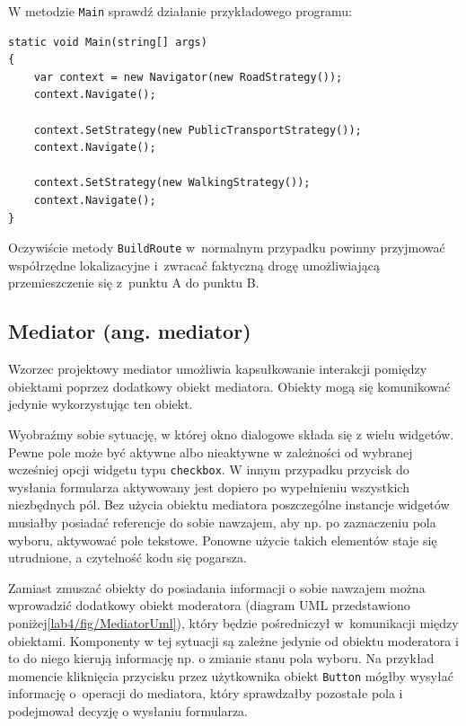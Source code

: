 W metodzie \texttt{Main} sprawdź działanie przykładowego programu:
\begin{lstlisting}
static void Main(string[] args)
{
	var context = new Navigator(new RoadStrategy());
	context.Navigate();
	
	context.SetStrategy(new PublicTransportStrategy());
	context.Navigate();
	
	context.SetStrategy(new WalkingStrategy());
	context.Navigate();
}
\end{lstlisting}

Oczywiście metody \texttt{BuildRoute} w~normalnym przypadku powinny przyjmować współrzędne lokalizacyjne i~zwracać faktyczną drogę umożliwiającą przemieszczenie się z~punktu A do punktu B.

\subsection{Mediator (ang. mediator)}

Wzorzec projektowy mediator umożliwia kapsułkowanie interakcji pomiędzy obiektami poprzez dodatkowy obiekt mediatora. Obiekty mogą się komunikować jedynie wykorzystując ten obiekt.


Wyobraźmy sobie sytuację, w której okno dialogowe składa się z wielu widgetów. Pewne pole może być aktywne albo nieaktywne w zależności od wybranej wcześniej opcji widgetu typu \texttt{checkbox}. W innym przypadku przycisk do wysłania formularza aktywowany jest dopiero po wypełnieniu wszystkich niezbędnych pól. Bez użycia obiektu mediatora poszczególne instancje widgetów musiałby posiadać referencje do sobie nawzajem, aby np. po zaznaczeniu pola wyboru, aktywować pole tekstowe. Ponowne użycie takich elementów staje się utrudnione, a czytelność kodu się pogarsza.


Zamiast zmuszać obiekty do posiadania informacji o sobie nawzajem można wprowadzić dodatkowy obiekt moderatora (diagram UML przedstawiono poniżej\ref{lab4/fig/MediatorUml}), który będzie pośredniczył w~komunikacji między obiektami. Komponenty w tej sytuacji są zależne jedynie od obiektu moderatora i to do niego kierują informację np. o zmianie stanu pola wyboru. Na przykład momencie kliknięcia przycisku przez użytkownika obiekt \texttt{Button} mógłby wysyłać informację o~operacji do mediatora, który sprawdzałby pozostałe pola i podejmował decyzję o wysłaniu formularza. 


